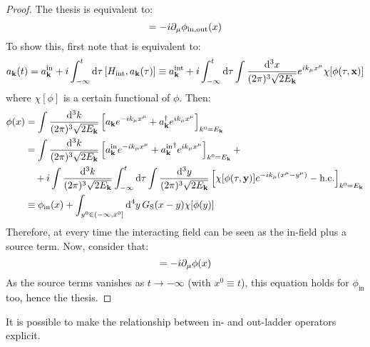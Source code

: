 \begin{proofbox}
  \begin{proof}
    The thesis is equivalent to:
    \begin{equation}
      [\hat{P}_\mu , \phi_\text{in,out}(x)] = -i \pa_\mu \phi_\text{in,out}(x)
    \end{equation}
    To show this, first note that  is equivalent to:
    \begin{equation*}
      a_{\mathbf{k}}(t) = a_{\mathbf{k}}^\text{in} + i \int_{-\infty}^t \mathrm{d} \tau\, [H_\text{int} , a_{\mathbf{k}}(\tau)] \equiv a_{\mathbf{k}}^\text{int} + i \int_{-\infty}^t \mathrm{d} \tau \int \frac{\mathrm{d}^3x}{(2\pi)^3 \sqrt{2E_{\mathbf{k}}}} e^{i k_\mu x^\mu} \chi[\phi(\tau,\mathbf{x})]
    \end{equation*}
    where $ \chi[\phi] $ is a certain functional of $ \phi $. Then:
    \begin{equation*}
      \begin{split}
        \phi(x)
        & = \int \frac{\mathrm{d}^3k}{(2\pi)^3 \sqrt{2E_{\mathbf{k}}}} \left[ a_{\mathbf{k}} e^{-i k_\mu x^\mu} + a_{\mathbf{k}}^\dagger e^{i k_\mu x^\mu} \right]_{k^0 = E_{\mathbf{k}}} \\
        & = \int \frac{\mathrm{d}^3k}{(2\pi)^3 \sqrt{2E_{\mathbf{k}}}} \left[ a_{\mathbf{k}}^\text{in} e^{-i k_\mu x^\mu} + {a_{\mathbf{k}}^\text{in}}^\dagger e^{i k_\mu x^\mu} \right]_{k^0 = E_{\mathbf{k}}} + \\
        & \quad + i \int \frac{\mathrm{d}^3k}{(2\pi)^3 \sqrt{2E_{\mathbf{k}}}} \int_{-\infty}^t \mathrm{d} \tau \int \frac{\mathrm{d}^3y}{(2\pi)^3 \sqrt{2E_{\mathbf{k}}}} \left[ \chi[\phi(\tau,\mathbf{y})] e^{-i k_\mu (x^\mu - y^\mu)} - \text{h.c.} \right]_{k^0 =  E_{\mathbf{k}}} \\
        & \equiv \phi_\text{in}(x) + \int_{y^0 \in (-\infty,x^0]} \mathrm{d}^4y\, G_\text{S}(x-y) \chi[\phi(y)]
      \end{split}
    \end{equation*}
    Therefore, at every time the interacting field can be seen as the in-field plus a source term. Now, consider that:
    \begin{equation*}
      [\hat{P}_\mu , \phi(x)] = -i \pa_\mu \phi(x)
    \end{equation*}
    As the source terms vanishes as $ t \rightarrow -\infty $ (with $ x^0 \equiv t $), this equation holds for $ \phi_\text{in} $ too, hence the thesis.
  \end{proof}
\end{proofbox}

It is possible to make the relationship between in- and out-ladder operators explicit.

